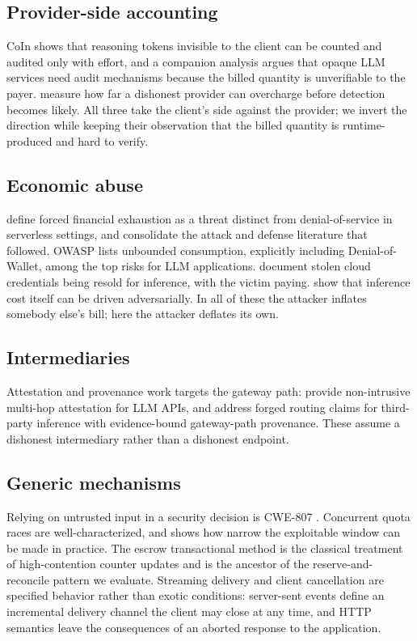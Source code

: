 \documentclass[preprint,3p,authoryear,12pt]{elsarticle}
\begin{document}
\subsection{Provider-side accounting}
CoIn \citep{coin} shows that reasoning tokens invisible to the client can be counted and
audited only with effort, and a companion analysis \citep{invisible} argues that opaque
LLM services need audit mechanisms because the billed quantity is unverifiable to the
payer. \citet{tokeninflation} measure how far a dishonest provider can overcharge before
detection becomes likely. All three take the client's side against the provider; we
invert the direction while keeping their observation that the billed quantity is
runtime-produced and hard to verify.

\subsection{Economic abuse}
\citet{dow} define forced financial exhaustion as a threat distinct from
denial-of-service in serverless settings, and \citet{dowreview} consolidate the attack
and defense literature that followed. OWASP \citep{owasp} lists unbounded consumption,
explicitly including Denial-of-Wallet, among the top risks for LLM applications.
\citet{llmjacking} document stolen cloud credentials being resold for inference, with the
victim paying. \citet{sponge} show that inference cost itself can be driven
adversarially. In all of these the attacker inflates somebody else's bill; here the
attacker deflates its own.

\subsection{Intermediaries}
Attestation and provenance work targets the gateway path: \citet{aex} provide
non-intrusive multi-hop attestation for LLM APIs, and \citet{gwprov} address forged
routing claims for third-party inference with evidence-bound gateway-path provenance.
These assume a dishonest intermediary rather than a dishonest endpoint.

\subsection{Generic mechanisms}
Relying on untrusted input in a security decision is CWE-807 \citep{cwe807}. Concurrent
quota races are well-characterized, and \citet{kettle} shows how narrow the exploitable
window can be made in practice. The escrow transactional method \citep{escrow} is the
classical treatment of high-contention counter updates and is the ancestor of the
reserve-and-reconcile pattern we evaluate. Streaming delivery and client cancellation are
specified behavior rather than exotic conditions: server-sent events \citep{sse} define
an incremental delivery channel the client may close at any time, and HTTP semantics
\citep{rfc9110} leave the consequences of an aborted response to the application.
\end{document}
